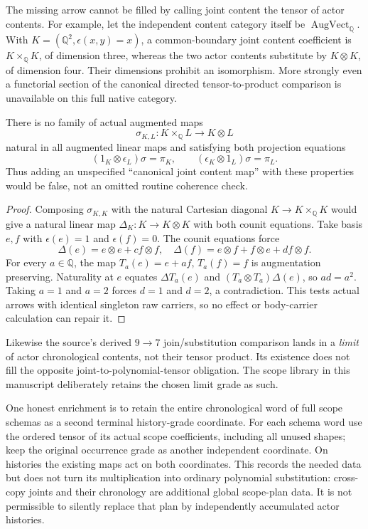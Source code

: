 \documentclass[11pt]{article}
\begin{document}
The missing arrow cannot be filled by calling joint content the tensor of actor contents. For example, let the independent content category itself be $\operatorname{AugVect}_{\mathbb Q}$. With $K=(\mathbb Q^2,\epsilon(x,y)=x)$, a common-boundary joint content coefficient is $K\times_{\mathbb Q}K$, of dimension three, whereas the two actor contents substitute by $K\otimes K$, of dimension four. Their dimensions prohibit an isomorphism. More strongly even a functorial section of the canonical directed tensor-to-product comparison is unavailable on this full native category.

\begin{proposition}
There is no family of actual augmented maps
\[
 \sigma_{K,L}:K\times_{\mathbb Q}L\longrightarrow K\otimes L
\]
natural in all augmented linear maps and satisfying both projection equations
\[
 (1_K\otimes\epsilon_L)\sigma=\pi_K,\qquad
 (\epsilon_K\otimes1_L)\sigma=\pi_L.
\]
Thus adding an unspecified ``canonical joint content map'' with these properties would be false, not an omitted routine coherence check.
\end{proposition}
\begin{proof}
Composing $\sigma_{K,K}$ with the natural Cartesian diagonal $K\to K\times_{\mathbb Q}K$ would give a natural linear map $\Delta_K:K\to K\otimes K$ with both counit equations. Take basis $e,f$ with $\epsilon(e)=1$ and $\epsilon(f)=0$. The counit equations force
\[
 \Delta(e)=e\otimes e+c f\otimes f,\quad
 \Delta(f)=e\otimes f+f\otimes e+d f\otimes f.
\]
For every $a\in\mathbb Q$, the map $T_a(e)=e+af$, $T_a(f)=f$ is augmentation preserving. Naturality at $e$ equates $\Delta T_a(e)$ and $(T_a\otimes T_a)\Delta(e)$, so $ad=a^2$. Taking $a=1$ and $a=2$ forces $d=1$ and $d=2$, a contradiction. This tests actual arrows with identical singleton raw carriers, so no effect or body-carrier calculation can repair it.
\end{proof}
Likewise the source's derived $9\to7$ join/substitution comparison lands in a \emph{limit} of actor chronological contents, not their tensor product. Its existence does not fill the opposite joint-to-polynomial-tensor obligation. The scope library in this manuscript deliberately retains the chosen limit grade as such.

One honest enrichment is to retain the entire chronological word of full scope schemas as a second terminal history-grade coordinate. For each schema word use the ordered tensor of its actual scope coefficients, including all unused shapes; keep the original occurrence grade as another independent coordinate. On histories the existing maps act on both coordinates. This records the needed data but does not turn its multiplication into ordinary polynomial substitution: cross-copy joints and their chronology are additional global scope-plan data. It is not permissible to silently replace that plan by independently accumulated actor histories.
\end{document}
